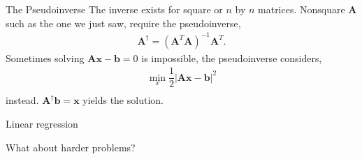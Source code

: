 \documentclass[notes=only]{beamer}
\begin{document}
    \begin{frame}{The Pseudoinverse \cite{strang2009introduction,deisenroth2020mathematics}}
      The inverse exists for square or $n$ by $n$ matrices.
      Nonsquare $\mathbf{A}$ such as the one we just saw, require the pseudoinverse,
        \begin{align}
          \mathbf{A}^{\dagger} = (\mathbf{A}^T\mathbf{A})^{-1}\mathbf{A}^T .
        \end{align}
      Sometimes solving $\mathbf{A}\mathbf{x} - \mathbf{b} = 0$ is impossible,
      the pseudoinverse considers,
        \begin{align}
          \min_x \dfrac{1}{2}|\mathbf{A}\mathbf{x} - \mathbf{b}|^2 \\
        \end{align}
      instead. $\mathbf{A}^{\dagger} \mathbf{b} = \mathbf{x}$ yields the solution.

    \end{frame}

    \begin{frame}{Linear regression}
      \begin{figure}
        
      \end{figure}
    \end{frame}

    \begin{frame}{What about harder problems?}
      \begin{figure}
        
      \end{figure}
    \end{frame}
\end{document}
